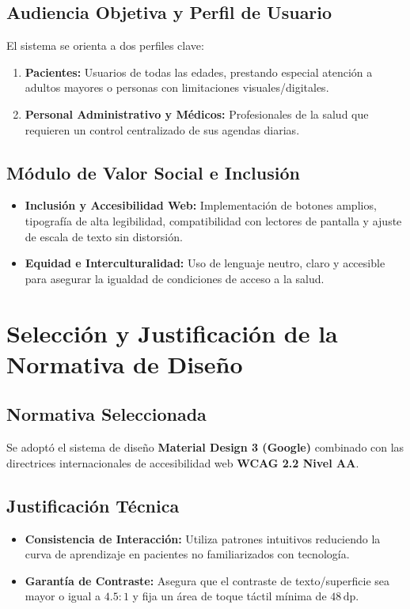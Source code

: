 \documentclass[12pt,a4paper]{article}
\begin{document}
\subsection{Audiencia Objetiva y Perfil de Usuario}
El sistema se orienta a dos perfiles clave:
\begin{enumerate}
    \item \textbf{Pacientes:} Usuarios de todas las edades, prestando especial atención a adultos mayores o personas con limitaciones visuales/digitales.
    \item \textbf{Personal Administrativo y Médicos:} Profesionales de la salud que requieren un control centralizado de sus agendas diarias.
\end{enumerate}

\subsection{Módulo de Valor Social e Inclusión}
\begin{itemize}[leftmargin=*]
    \item \textbf{Inclusión y Accesibilidad Web:} Implementación de botones amplios, tipografía de alta legibilidad, compatibilidad con lectores de pantalla y ajuste de escala de texto sin distorsión.
    \item \textbf{Equidad e Interculturalidad:} Uso de lenguaje neutro, claro y accesible para asegurar la igualdad de condiciones de acceso a la salud.
\end{itemize}

\section{Selección y Justificación de la Normativa de Diseño}
\subsection{Normativa Seleccionada}
Se adoptó el sistema de diseño \textbf{Material Design 3 (Google)} combinado con las directrices internacionales de accesibilidad web \textbf{WCAG 2.2 Nivel AA}.

\subsection{Justificación Técnica}
\begin{itemize}[leftmargin=*]
    \item \textbf{Consistencia de Interacción:} Utiliza patrones intuitivos reduciendo la curva de aprendizaje en pacientes no familiarizados con tecnología.
    \item \textbf{Garantía de Contraste:} Asegura que el contraste de texto/superficie sea mayor o igual a $4.5:1$ y fija un área de toque táctil mínima de $48\,\text{dp}$.
\end{itemize}
\end{document}
